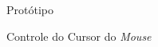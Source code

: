 \begin{chapter}{Protótipo}
\begin{section}{Controle do Cursor do \textit{Mouse}}
\end{section}

\end{chapter}
